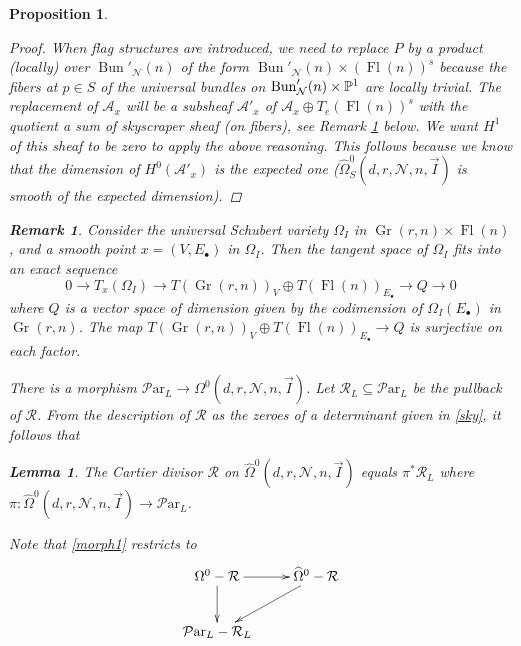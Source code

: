 \documentclass[11pt]{amsart}
\newcommand\op{\operatorname}
\newcommand\bull{{\bullet}}
\newcommand\Fl{\operatorname{Fl}}
\newcommand\ma{\mathcal{A}}
\newcommand\mn{\mathcal{N}}
\newcommand\ParL{\mathcal{P}\text{ar}_L}
\newcommand\Gr{\operatorname{Gr}}
\newtheorem{remark}[theorem]{ Remark}
\newtheorem{proposition}[theorem]{Proposition}
\newtheorem{lemma}[theorem]{Lemma}
\numberwithin{theorem}{subsection}
\begin{document}
{\begin{proposition}
\begin{proof}
When flag structures are introduced, we need to replace $P$ by a product (locally) over $\op{Bun}'_{\mn}(n)$ of the form $\op{Bun}'_{\mn}(n)\times (\Fl(n))^s$ because the fibers at $p\in S$ of the universal bundles on $\op{Bun}'_{\mn}(n)\times \Bbb{P}^1$ are locally trivial. The replacement of $\ma_x$ will be a subsheaf $\ma'_x$ of $\ma_x\oplus T_e(\Fl(n))^s$ with the quotient a sum of skyscraper sheaf (on fibers), see Remark \ref{afternoon} below. We want $H^1$ of this sheaf to be zero to apply the above reasoning. This follows because we know that the dimension of $H^0(\ma'_x)$ is the expected one ($\widehat{\Omega}^0_S(d,r,\mn,n,\vec{I})$ is smooth of the expected dimension).
\end{proof}
\begin{remark}\label{afternoon}
Consider the universal Schubert variety $\Omega_I$ in $\Gr(r,n)\times\Fl(n)$, and a smooth point $x=(V,E_{\bull})$ in $\Omega_I$. Then the tangent space of $\Omega_I$ fits into an exact sequence
$$0\to T_x(\Omega_I) \to T(\Gr(r,n))_V\oplus T(\Fl(n))_{E_{\bull}}\to Q\to 0$$ where $Q$ is a vector space of dimension given by the codimension of $\Omega_I(E_{\bull})$ in $\Gr(r,n)$. The map $T(\Gr(r,n))_V\oplus T(\Fl(n))_{E_{\bull}}\to Q$ is surjective on each factor.
\end{remark}
There is a morphism  $\ParL\to {\Omega}^0(d,r,\mn,n,\vec{I})$. Let $\mathcal{R}_L\subseteq \ParL$ be the pullback of $\mathcal{R}$. From the description of $\mathcal{R}$ as the zeroes of a determinant given in \eqref{sky}, it follows that
\begin{lemma}
The Cartier divisor $\mathcal{R}$ on  $\widehat{\Omega}^0(d,r,\mn,n,\vec{I})$ equals $\pi^*\mathcal{R}_L$ where
$\pi: \widehat{\Omega}^0(d,r,\mn,n,\vec{I})\to \ParL$.
\end{lemma}

Note that \eqref{morph1} restricts to
 \begin{equation}
\xymatrix{
 \Omega^0-\mathcal{R} \ar[r]\ar[d] &  \widehat{\Omega}^0-\mathcal{R}\ar[dl]\\
\ParL-\mathcal{R}_L
}
\end{equation}

\end{proposition}}
\end{document}
